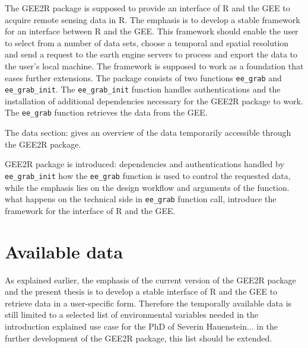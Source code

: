 \documentclass[11pt,twoside,a4paper,final]{report}
\begin{document}
The GEE2R package is supposed to provide an interface of R and the GEE to acquire remote sensing data in R. The emphasis is to develop a stable framework for an interface between R and the GEE. This framework should enable the user to select from a number of data sets, choose a temporal and spatial resolution and send a request to the earth engine servers to process and export the data to the user's local machine. The framework is supposed to work as a foundation that eases further extensions.
The package consists of two functions \texttt{ee\_grab} and \texttt{ee\_grab\_init}. The \texttt{ee\_grab\_init} function handles authentications and the installation of additional dependencies necessary for the GEE2R package to work. The \texttt{ee\_grab} function retrieves the data from the GEE.

The data section:
gives an overview of the data temporarily accessible through the GEE2R package. 

GEE2R package is introduced:
dependencies and authentications handled by \texttt{ee\_grab\_init}
how the \texttt{ee\_grab} function is used to control the requested data, while the emphasis lies on the design workflow and arguments of the function.
what happens on the technical side in \texttt{ee\_grab} function call, introduce the framework for the interface of R and the GEE.

\section{Available data}
As explained earlier, the emphasis of the current version of the GEE2R package and the present thesis is to develop a stable interface of R and the GEE to retrieve data in a user-specific form. Therefore the temporally available data is still limited to a selected list of environmental variables needed in the introduction explained use case for the PhD of Severin Hauenstein...
in the further development of the GEE2R package, this list should be extended.
\end{document}
